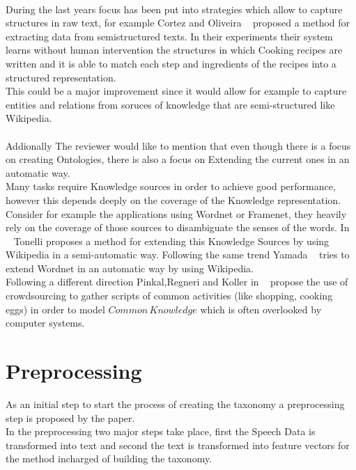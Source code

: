 \documentclass[4pt,a4paper,twocolumn]{article}
\begin{document}
\\
During the last years focus has been put into strategies which allow to capture structures in raw text, for example Cortez and Oliveira ~\cite{Cortez:2011:JUS:1989323.1989380} proposed a method for extracting data from semistructured texts. In their experiments their system learns without human intervention the structures in which Cooking recipes are written and it is able to match each step and ingredients of the recipes into a structured representation.\\
This could be a major improvement since it would allow for example to capture entities and relations from soruces of knowledge that are semi-structured like Wikipedia.\\
\\
Addionally The reviewer would like to mention that even though there is a focus on creating Ontologies, there is also a focus on Extending the current ones in an automatic way.\\
Many tasks require Knowledge sources in order to achieve good performance, however this depends deeply on the coverage of the Knowledge representation. 
Consider for example the applications using Wordnet or Framenet, they heavily rely on the coverage of those sources to disambiguate the senses of the words.
In ~\cite{Tonelli:2013:WWM:2405838.2405917} Tonelli proposes a method for extending this Knowledge Sources by using Wikipedia in a semi-automatic way.
Following the same trend Yamada ~\cite{yamada-EtAl:2011:IJCNLP-2011} tries to extend Wordnet in an automatic way by using Wikipedia.\\
Following a different direction Pinkal,Regneri and Koller  in ~\cite{regneri-koller-pinkal:2010:ACL} propose the use of crowdsourcing to gather scripts of common activities (like shopping, cooking eggs) in order to model $Common\, Knowledge$ which is often overlooked by computer systems.


\section{Preprocessing }
As an initial step to start the process of creating the taxonomy a preprocessing step is proposed by the paper.\\
In the preprocessing two major steps take place, first the Speech Data is transformed into text and second the text is transformed into feature vectors for the method incharged of building the taxonomy.
\end{document}
